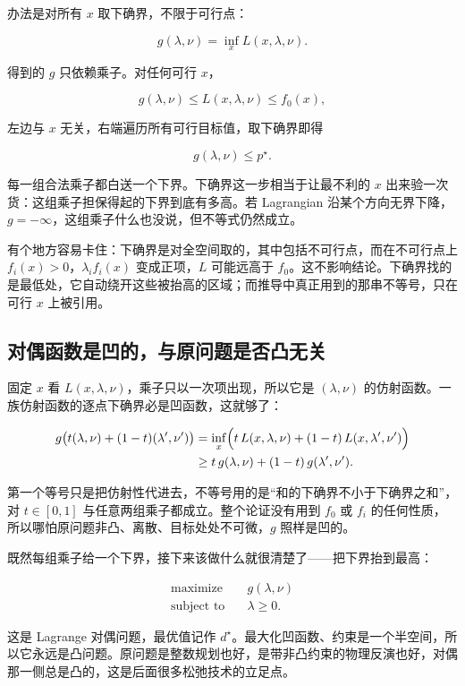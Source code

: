 办法是对所有 \(x\) 取下确界，不限于可行点：

\[
g(\lambda,\nu) = \inf_x L(x,\lambda,\nu).
\]

得到的 \(g\) 只依赖乘子。对任何可行 \(x\)，

\[
g(\lambda,\nu)\le L(x,\lambda,\nu)\le f_0(x),
\]

左边与 \(x\) 无关，右端遍历所有可行目标值，取下确界即得

\[
g(\lambda,\nu)\le p^\star.
\]

每一组合法乘子都白送一个下界。下确界这一步相当于让最不利的 \(x\) 出来验一次货：这组乘子担保得起的下界到底有多高。若 Lagrangian 沿某个方向无界下降，\(g=-\infty\)，这组乘子什么也没说，但不等式仍然成立。

有个地方容易卡住：下确界是对全空间取的，其中包括不可行点，而在不可行点上 \(f_i(x)>0\)，\(\lambda_i f_i(x)\) 变成正项，\(L\) 可能远高于 \(f_0\)。这不影响结论。下确界找的是最低处，它自动绕开这些被抬高的区域；而推导中真正用到的那串不等号，只在可行 \(x\) 上被引用。

\subsection{对偶函数是凹的，与原问题是否凸无关}

固定 \(x\) 看 \(L(x,\lambda,\nu)\)，乘子只以一次项出现，所以它是 \((\lambda,\nu)\) 的仿射函数。一族仿射函数的逐点下确界必是凹函数，这就够了：

\[
\begin{aligned}
g\big(t(\lambda,\nu)+(1-t)(\lambda',\nu')\big)
&=\inf_x\Bigl(t\,L(x,\lambda,\nu)+(1-t)\,L(x,\lambda',\nu')\Bigr)\\
&\ge t\,g(\lambda,\nu)+(1-t)\,g(\lambda',\nu').
\end{aligned}
\]

第一个等号只是把仿射性代进去，不等号用的是``和的下确界不小于下确界之和''，对 \(t\in[0,1]\) 与任意两组乘子都成立。整个论证没有用到 \(f_0\) 或 \(f_i\) 的任何性质，所以哪怕原问题非凸、离散、目标处处不可微，\(g\) 照样是凹的。

既然每组乘子给一个下界，接下来该做什么就很清楚了——把下界抬到最高：

\[
\begin{aligned}
\text{maximize}\quad&g(\lambda,\nu)\\
\text{subject to}\quad&\lambda\ge0.
\end{aligned}
\]

这是 Lagrange 对偶问题，最优值记作 \(d^\star\)。最大化凹函数、约束是一个半空间，所以它永远是凸问题。原问题是整数规划也好，是带非凸约束的物理反演也好，对偶那一侧总是凸的，这是后面很多松弛技术的立足点。

